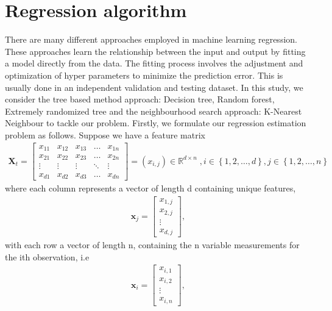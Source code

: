 \section{Regression algorithm} 
\label{algo1}
There are many different approaches employed in machine learning regression. These approaches learn the relationship between the input and output by fitting a model directly from the data. The fitting process involves the adjustment and optimization of hyper parameters to minimize the prediction error. This is usually done  in an independent validation and testing dataset. In this study, we consider the tree based method approach: Decision tree, Random forest, Extremely randomized tree and the neighbourhood search approach: K-Nearest Neighbour to tackle our problem. Firstly, we formulate our regression estimation problem as follows. Suppose we have a feature matrix 
\begin{align*}
\textbf{X}_{t}=\begin{bmatrix}
    x_{11} & x_{12} & x_{13} & \dots  & x_{1n} \\
    x_{21} & x_{22} & x_{23} & \dots  & x_{2n} \\
    \vdots & \vdots & \vdots & \ddots & \vdots \\
    x_{d1} & x_{d2} & x_{d3} & \dots  & x_{dn}
\end{bmatrix}=(x_{i,j}) \in  \mathbb{R}^{d \times n}\;, i\in \left\{1,2,\dots, d\right\}, j \in \left\{1,2,\dots,n\right\}
\end{align*}
where each column represents a vector of length d containing unique features, 
\begin{align*}
\textbf{x}_j=\begin{bmatrix}
    x_{1,j}  \\
    x_{2,j} \\
    \vdots \\
    x_{d,j} 
\end{bmatrix},
\end{align*}
with each row a vector of length n, containing the n variable measurements for the ith observation, i.e 
\begin{align*}
\textbf{x}_i=\begin{bmatrix}
    x_{i,1}  \\
    x_{i,2} \\
    \vdots \\
    x_{i,n} 
\end{bmatrix},
\end{align*}

